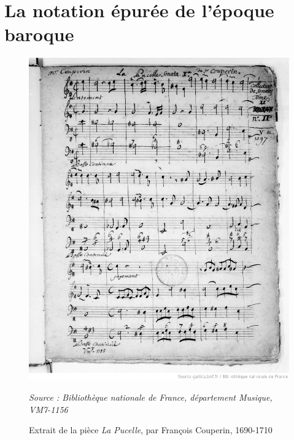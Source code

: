 \section{La notation épurée de l'époque baroque}
\label{sec:exempleMusiqueBaroque}
\begin{figure}[H]
	\centering
	\includegraphics[keepaspectratio=true, width=\textwidth]{Annexes/i/exempleMusiqueBaroque.jpeg}
	\caption{Extrait de la pièce \textit{La Pucelle}, par François Couperin, 1690-1710}
	\medskip
	\small
	\textit{Source : Bibliothèque nationale de France, département Musique, VM7-1156} 	
	\label{fig:exempleMusiqueBaroque}
\end{figure}
\clearpage

